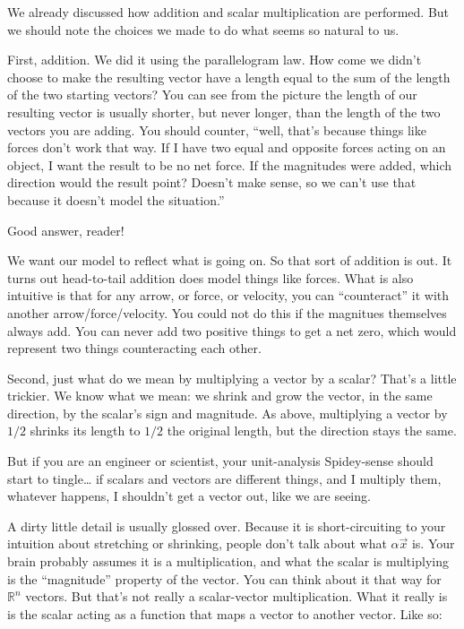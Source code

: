 \documentclass[
]{book}
\begin{document}
We already discussed how addition and scalar multiplication are performed. But we should note the choices we made to do what seems so natural to us.

First, addition. We did it using the parallelogram law. How come we didn't choose to make the resulting vector have a length equal to the sum of the length of the two starting vectors? You can see from the picture the length of our resulting vector is usually shorter, but never longer, than the length of the two vectors you are adding. You should counter, ``well, that's because things like forces don't work that way. If I have two equal and opposite forces acting on an object, I want the result to be no net force. If the magnitudes were added, which direction would the result point? Doesn't make sense, so we can't use that because it doesn't model the situation.''

Good answer, reader!

We want our model to reflect what is going on. So that sort of addition is out. It turns out head-to-tail addition does model things like forces. What is also intuitive is that for any arrow, or force, or velocity, you can ``counteract'' it with another arrow/force/velocity. You could not do this if the magnitues themselves always add. You can never add two positive things to get a net zero, which would represent two things counteracting each other.

Second, just what do we mean by multiplying a vector by a scalar? That's a little trickier. We know what we mean: we shrink and grow the vector, in the same direction, by the scalar's sign and magnitude. As above, multiplying a vector by \(1/2\) shrinks its length to \(1/2\) the original length, but the direction stays the same.

But if you are an engineer or scientist, your unit-analysis Spidey-sense should start to tingle\ldots{} if scalars and vectors are different things, and I multiply them, whatever happens, I shouldn't get a vector out, like we are seeing.

A dirty little detail is usually glossed over. Because it is short-circuiting to your intuition about stretching or shrinking, people don't talk about what \(\alpha \vec{x}\) is. Your brain probably assumes it is a multiplication, and what the scalar is multiplying is the ``magnitude'' property of the vector. You can think about it that way for \(\mathbb{R}^n\) vectors. But that's not really a scalar-vector multiplication. What it really is is the scalar acting as a function that maps a vector to another vector. Like so:
\end{document}
